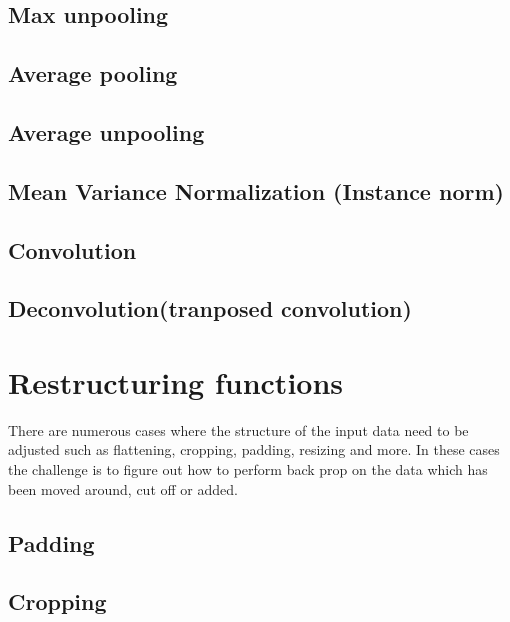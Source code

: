 \documentclass[a4paper]{article}
\begin{document}
\subsection{Max unpooling}
\subsection{Average pooling}
\subsection{Average unpooling}
\subsection{Mean Variance Normalization (Instance norm)}
\subsection{Convolution}
\subsection{Deconvolution(tranposed convolution)}

\newpage
\section{Restructuring functions}
There are numerous cases where the structure of the input data need to be adjusted such as flattening, cropping, padding, resizing and more. In these cases the challenge is to figure out how to perform back prop on the data which has been moved around, cut off or added. 
\subsection{Padding}
\subsection{Cropping}
\end{document}
